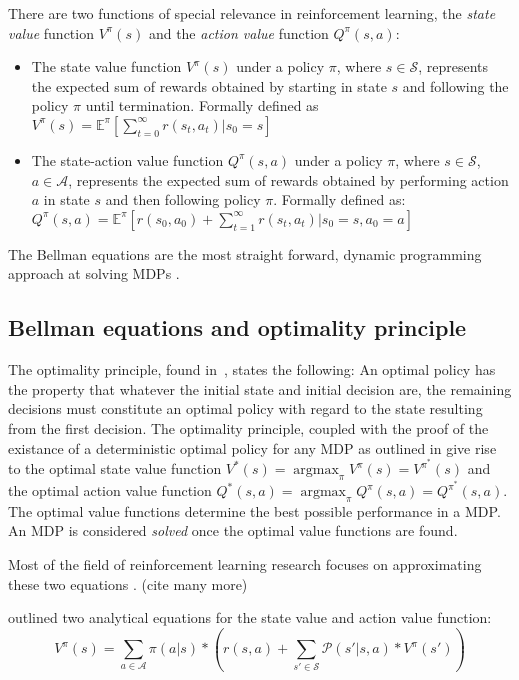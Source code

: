 \documentclass{../main.tex}{subfiles}
\begin{document}
There are two functions of special relevance in reinforcement learning, the \textit{state value} function $V^{\pi}(s)$ and the \textit{action value} function $Q^{\pi}(s, a)$:
\begin{itemize}
\item The state value function $V^{\pi}(s)$ under a policy $\pi$, where $s \in \mathcal{S}$, represents the expected sum of rewards obtained by starting in state $s$ and following the policy $\pi$ until termination. Formally defined as $V^{\pi}(s) = \mathbb{E}^{\pi}[\sum^{\infty}_{t=0} r(s_t, a_t) | s_0 = s] $
\item The state-action value function $Q^{\pi}(s, a)$ under a policy $\pi$, where $s \in \mathcal{S}$, $a \in \mathcal{A}$, represents the expected sum of rewards obtained by performing action $a$ in state $s$ and then following policy $\pi$. Formally defined as: $Q^{\pi}(s, a) = \mathbb{E}^{\pi}[r(s_0, a_0) + \sum^{\infty}_{t=1} r(s_t, a_t) | s_0 = s, a_0 = a]$
\end{itemize}

The Bellman equations are the most straight forward, dynamic programming approach at solving MDPs \citep{Bertsekas2007, Bellman1957}.

\subsection{Bellman equations and optimality principle}

The optimality principle, found in~\cite{Bellman1957}, states the following: An optimal policy has the property that whatever the initial state and initial decision are, the remaining decisions must constitute an optimal policy with regard to the state resulting from the first decision. The optimality principle, coupled with the proof of the existance of a deterministic optimal policy for any MDP as outlined in \citep{Borkar1988} give rise to the optimal state value function $V^{*}(s) = \operatorname*{argmax}_{\pi} V^{\pi}(s) = V^{\pi^{*}}(s)$ and the optimal action value function $Q^{*}(s,a) = \operatorname*{argmax}_{\pi} Q^{\pi}(s, a) = Q^{\pi^{*}}(s, a)$. The optimal value functions determine the best possible performance in a MDP\@. An MDP is considered \textit{solved} once the optimal value functions are found. 

Most of the field of reinforcement learning research focuses on approximating these two equations \citep{Tamar2017} \citep{Watkins1992} \citep{Mnih2013}. (cite many more)

\cite{Bellman1957} outlined two analytical equations for the state value and action value function:
\begin{equation}\label{equation:bellman:state-value-function}
V^{\pi}(s) = \sum_{a \in \mathcal{A}} \pi(a | s) * (r(s, a) + \sum_{s' \in \mathcal{S}} \mathcal{P}(s' | s, a) * V^{\pi}(s'))
\end{equation}
\end{document}
